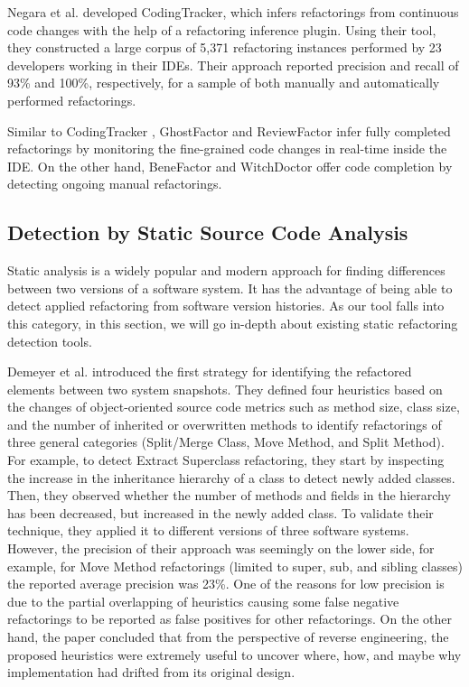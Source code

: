 \documentclass[letterpaper,12pt,onecolumn,final]{report}
\begin{document}
Negara et al. \cite{Negara2013} developed CodingTracker, which infers refactorings from continuous code changes with the help of a refactoring inference plugin. Using their tool, they constructed a large corpus of 5,371 refactoring instances performed by 23 developers working in their IDEs. Their approach reported precision and recall of 93\% and 100\%, respectively, for a sample of both manually and automatically performed refactorings.

Similar to CodingTracker \cite{Negara2013}, GhostFactor \cite{Ge2014} and ReviewFactor \cite{Ge2017} infer fully completed refactorings by monitoring the fine-grained code changes in real-time inside the IDE. On the other hand, BeneFactor \cite{Ge2012} and WitchDoctor \cite{Foster2012} offer code completion by detecting ongoing manual refactorings.

\subsection{Detection by Static Source Code Analysis}
Static analysis is a widely popular and modern approach for finding differences between two versions of a software system. It has the advantage of being able to detect applied refactoring from software version histories. As our tool falls into this category, in this section, we will go in-depth about existing static refactoring detection tools.

Demeyer et al. \cite{Demeyer2000} introduced the first strategy for identifying the refactored elements between two system snapshots. They defined four heuristics based on the changes of object-oriented source code metrics such as method size, class size, and the number of inherited or overwritten methods to identify refactorings of three general categories (Split/Merge Class, Move Method, and Split Method). For example, to detect Extract Superclass refactoring, they start by inspecting the increase in the inheritance hierarchy of a class to detect newly added classes. Then, they observed whether the number of methods and fields in the hierarchy has been decreased, but increased in the newly added class. To validate their technique, they applied it to different versions of three software systems. However, the precision of their approach was seemingly on the lower side, for example, for Move Method refactorings (limited to super, sub, and sibling classes) the reported average precision was 23\%. One of the reasons for low precision is due to the partial overlapping of heuristics causing some false negative refactorings to be reported as false positives for other refactorings. On the other hand, the paper concluded that from the perspective of reverse engineering, the proposed heuristics were extremely useful to uncover where, how, and maybe why implementation had drifted from its original design.
\end{document}
